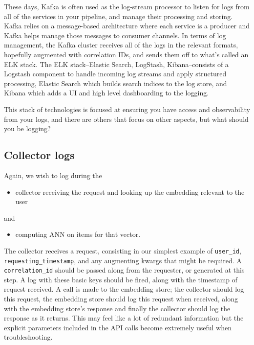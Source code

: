 These days, Kafka is often used as the log-stream processor to listen for logs from all of the services in your pipeline, and manage their processing and storing. Kafka relies on a message-based architecture where each service is a producer and Kafka helps manage those messages to consumer channels. In terms of log management, the Kafka cluster receives all of the logs in the relevant formats, hopefully augmented with correlation IDs, and sends them off to what's called an ELK stack. The ELK stack–Elastic Search, LogStash, Kibana–consists of a Logstash component to handle incoming log streams and apply structured processing, Elastic Search which builds search indices to the log store, and Kibana which adds a UI and high level dashboarding to the logging.

This stack of technologies is focused at ensuring you have access and observability from your logs, and there are others that focus on other aspects, but what should you be logging?

\subsection{Collector logs}

Again, we wish to log during the 

\begin{itemize}
\item collector receiving the request and looking up the embedding relevant to the user
\end{itemize}

and

\begin{itemize}
\item computing ANN on items for that vector.
\end{itemize}

The collector receives a request, consisting in our simplest example of \lstinline{user_id}, \lstinline{requesting_timestamp}, and any augmenting kwargs that might be required. A \lstinline{correlation_id} should be passed along from the requester, or generated at this step. A log with these basic keys should be fired, along with the timestamp of request received. A call is made to the embedding store; the collector should log this request, the embedding store should log this request when received, along with the embedding store's response and finally the collector should log the response as it returns. This may feel like a lot of redundant information but the explicit parameters included in the API calls become extremely useful when troubleshooting. 

